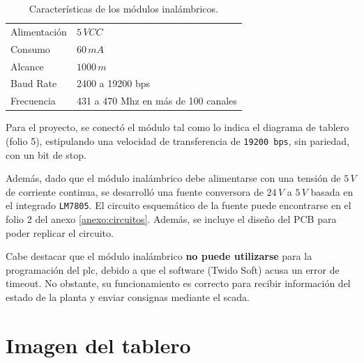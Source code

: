 \begin{table}[h]
\centering
\begin{tabular}{|l|l|}
\hline
Alimentación & $5\,VCC$\\
Consumo& $60\,mA$\\
Alcance& $1000\,m$\\
Baud Rate &2400 a 19200 bps \\
Frecuencia& 431 a 470 Mhz en más de 100 canales\\
\hline
\end{tabular}
\caption{Características de los módulos inalámbricos.}
\label{tab:caractMod}
\end{table}

Para el proyecto, se conectó el módulo tal como lo indica el
diagrama de tablero (folio 5), estipulando una velocidad de transferencia de
\verb|19200 bps|, sin pariedad, con un bit de stop.

Además, dado que el módulo inalámbrico debe alimentarse con una tensión de
$5\,V$ de corriente continua, se desarrolló una fuente conversora de $24\,V$ a
$5\,V$ basada en el integrado \verb|LM7805|.
El circuito esquemático de la fuente puede encontrarse en el folio 2 del anexo
\ref{anexo:circuitos}.
Además, se incluye el diseño del PCB para poder replicar el circuito.

Cabe destacar que el módulo inalámbrico \textbf{no puede utilizarse} para
la programación del \gls{plc}, debido a que el software (Twido Soft) acusa un
error de timeout.
No obstante, su funcionamiento es correcto para recibir información
del estado de la planta y enviar consignas mediante el \gls{scada}.

\section{Imagen del tablero}

